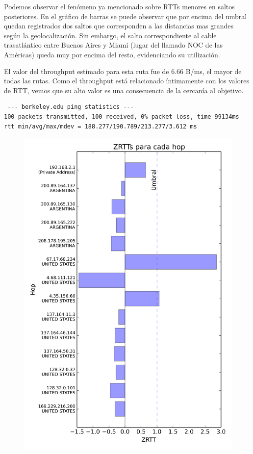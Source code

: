 Podemos observar el fenómeno ya mencionado sobre RTTs menores en saltos posteriores. En el gráfico de barras se puede observar que por encima del umbral quedan registrados dos saltos que corresponden a las distancias mas grandes según la geolocalización. Sin embargo, el salto correspondiente al cable trasatlántico entre Buenos Aires y Miami (lugar del llamado NOC de las Américas) queda muy por encima del resto, evidenciando su utilización.

El valor del throughput estimado para esta ruta fue de 6.66 B/ms, el mayor de todas las rutas. Como el throughput está relacionado íntimamente con los valores de RTT, vemos que su alto valor es una consecuencia de la cercanía al objetivo.

\begin{verbatim}
 --- berkeley.edu ping statistics ---
100 packets transmitted, 100 received, 0% packet loss, time 99134ms
rtt min/avg/max/mdev = 188.277/190.789/213.277/3.612 ms
\end{verbatim}

\begin{figure}[htp]
 \centering
 \includegraphics[scale=0.50]{imgs/berkeley.png}
\end{figure}

